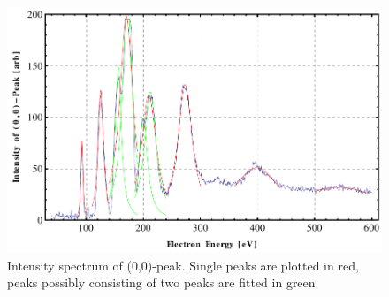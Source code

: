 \documentclass[a4paper,10pt]{scrartcl}
\begin{document}
\begin{figure}
\centering
\includegraphics[scale=0.55]{img/iv}
\caption{Intensity spectrum of (0,0)-peak. Single peaks are plotted in red, peaks possibly consisting of two peaks are fitted in green.\label{fig:iv}}
\end{figure}
\end{document}
